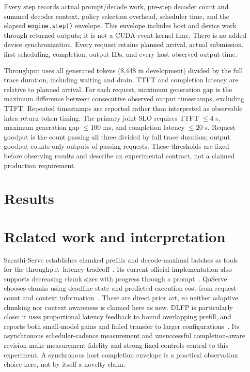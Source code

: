 \documentclass[10pt,a4paper]{article}
\begin{document}
Every step records actual prompt/decode work, pre-step decoder count and summed
decoder context, policy selection overhead, scheduler time, and the elapsed
\texttt{engine.step()} envelope. This envelope includes host and device work
through returned outputs; it is not a CUDA-event kernel time. There is no added
device synchronization. Every request retains planned arrival, actual submission,
first scheduling, completion, output IDs, and every host-observed output time.

Throughput uses all generated tokens (8,448 in development) divided by the full trace duration,
including waiting and drain. TTFT and completion latency are relative to planned
arrival. For each request, maximum generation gap is the maximum difference
between consecutive observed output timestamps, excluding TTFT. Repeated
timestamps are reported rather than interpreted as observable intra-return token
timing. The primary joint SLO requires TTFT $\leq4$ s, maximum generation gap
$\leq100$ ms, and completion latency $\leq20$ s. Request goodput is the count
passing all three divided by full trace duration; output goodput counts only
outputs of passing requests. These thresholds are fixed before observing results
and describe an experimental contract, not a claimed production requirement.

\section{Results}



\section{Related work and interpretation}
Sarathi-Serve establishes chunked prefills and decode-maximal batches as tools for
the throughput--latency tradeoff~\cite{sarathi}. Its current official implementation
also supports decreasing chunk sizes with progress through a prompt~\cite{sarathicode}.
QoServe chooses chunks using deadline state and predicted execution cost from
request count and context information~\cite{qoserve}. These are direct prior art,
so neither adaptive chunking nor context awareness is claimed here as new.
DLFP is particularly close: it uses proportional latency feedback to bound
overlapping prefill, and reports both small-model gains and failed transfer to
larger configurations~\cite{dlfp}. Its asynchronous scheduler-cadence measurement
and unsuccessful completion-aware revision make measurement fidelity and strong
fixed controls central to this experiment. A synchronous host completion
envelope is a practical observation choice here, not by itself a novelty claim.
\end{document}
